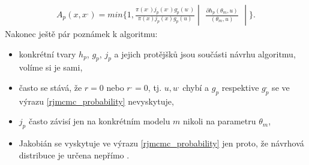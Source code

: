 \documentclass[czech,master,public,dept470,male,cpdeclaration,oneside, python]{diploma}
\begin{document}
\begin{align}\label{rjmcmc_probability}
A_p(x, x^{,}) = min\{1, \frac{\pi(x^{,})j_p(x^{,})g^{,}_p(u^{,})}{\pi(x)j_p(x)g_p(u)}
\begin{vmatrix} \frac{\partial h_p(\theta_m, u)}{(\theta_m, u)} \end{vmatrix}\}.
\end{align}
Nakonec ještě pár poznámek k algoritmu:
\begin{itemize}
	\item konkrétní tvary $h_p$, $g_p$, $j_p$ a jejich protějšků jsou součásti návrhu algoritmu, volíme si je sami,
	\item často se stává, že $r=0$ nebo $r^{,}=0$, tj. $u, u^{,}$ chybí a $g_p$ respektive $g^{,}_p$ se ve výrazu \eqref{rjmcmc_probability} nevyskytuje,
	\item $j_p$ často závisí jen na konkrétním modelu $m$ nikoli na parametru $\theta_m$,
	\item Jakobián se vyskytuje ve výrazu \eqref{rjmcmc_probability} jen proto, že návrhová distribuce je určena nepřímo \cite{green2009reversible}.
\end{itemize}
\end{document}
